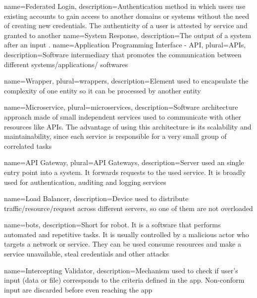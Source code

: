  {
    name={Federated Login},
    description={Authentication method in which users use existing accounts to gain access to another domains or systems
    without the need of creating new credentials. The authenticity of a user is attested by service and granted to another 
    \cite{refonline:MRFL}}
}
 {
    name={System Response},
    description={The output of a system after an input \cite{refonline:HWHE}.
    \cite{refonline:MRFL}}
}
 {
    name={Application Programming Interface - API},
    plural={APIs},
    description={Software intermediary that promotes the communication between different systems/applications/
    softwares\cite{refonline:MSAPI}}
}

 {
    name={Wrapper},
    plural={wrappers},
    description={Element used to encapsulate the complexity of one entity so it can be processed by another entity 
    \cite{refonline:techwrap}}
}

 {
    name={Microservice},
    plural={microservices},
    description={Software architecture approach made of small independent services used to communicate with other
    resources like APIs. The advantage of using this architecture is its scalability and maintainability, since 
    each service is responsible for a very small group of correlated tasks \cite{refonline:awsmicro}}
}

 {
    name={API Gateway},
    plural={API Gateways},
    description={Server used an single entry point into a system. It forwards requests to the used service. It is 
    broadly used for authentication, auditing and logging services \cite{refonline:crpag}}
}

 {
    name={Load Balancer},
    description={Device used to distribute traffic/resource/request across different servers, so one of them
    are not overloaded \cite{refonline:nglb}}
}

 {
    name={bots},
    description={Short for robot. It is a software that performs automated and repetitive tasks. It is usually
    controlled by a malicious actor who targets a network or service. They can be used consume resources
    and make a service unavailable, steal credentials and other attacks \cite{refonline:kpbot}}
}

 {
    name={Intercepting Validator},
    description={Mechanism used to check if user's input (data or file) corresponds to the criteria defined in
    the app. Non-conform input are discarded before even reaching the app \cite{refonline:kpbot}}
}

